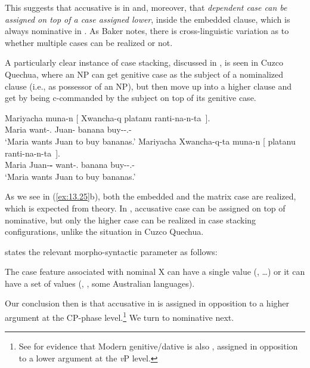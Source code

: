 \documentclass[output=paper]{langsci/langscibook}
\begin{document}
This suggests that accusative is  in  and, moreover, that
\emph{dependent case can be assigned on top of a case assigned lower}, inside
the embedded clause, which is always nominative in .  As Baker notes,
there is cross-linguistic variation as to whether multiple cases can be
realized or not.

A particularly clear instance of case stacking, discussed in \citet{Baker2015},
is seen in Cuzco Quechua, where an NP can get genitive case
as the subject of a nominalized clause (i.e., as possessor of an NP), but then
move up into a higher clause and get  by being c-commanded
by the subject on top of its genitive case.

\ea%
\label{ex:13.25} \parencite[116]{Baker2015}
	\ea
	\gll  Mariyacha muna-n  [ Xwancha-q platanu ranti-na-n-ta~].\\
        Maria want-\Third.\Sbj{} {} Juan-\textbf{\Gen{}}  banana buy-\Nmlz{}-\Third.\Poss{}-\Acc{}\\
	\glt     ‘Maria wants Juan to buy bananas.’
	\ex
	\gll  Mariyacha  Xwancha-q-ta muna-n [ platanu ranti-na-n-ta~].\\
        Maria    Juan-\textbf{\Gen{}-\Acc{}} want-\Third.\Sbj{} {} banana buy-\Nmlz{}-\Third.\Poss{}-\Acc{}\\
	\glt     ‘Maria wants Juan to buy bananas.’
    \z
\z

As we see in (\ref{ex:13.25}b), both the embedded and the matrix case are
realized, which is expected from  theory. In ,
accusative case can be assigned on top of nominative, but
only the higher case can be realized in case stacking configurations, unlike
the situation in Cuzco Quechua.

\citet{Baker2015} states the relevant morpho-syntactic parameter as follows:

\ea%
    \label{ex:13.26}
    The case feature associated with nominal X can have a single value
    (, \emph{} \dots) or it can have a set of values
    (, , some Australian languages).
\z

Our conclusion then is that accusative in  is  assigned in
opposition to a higher argument at the CP-phase level.\footnote{See
    \citet{AnaSev2016} for evidence that Modern  genitive/dative is also
    , assigned in opposition to a lower argument at the \emph{v}P
level.} We turn to nominative next.
\end{document}
